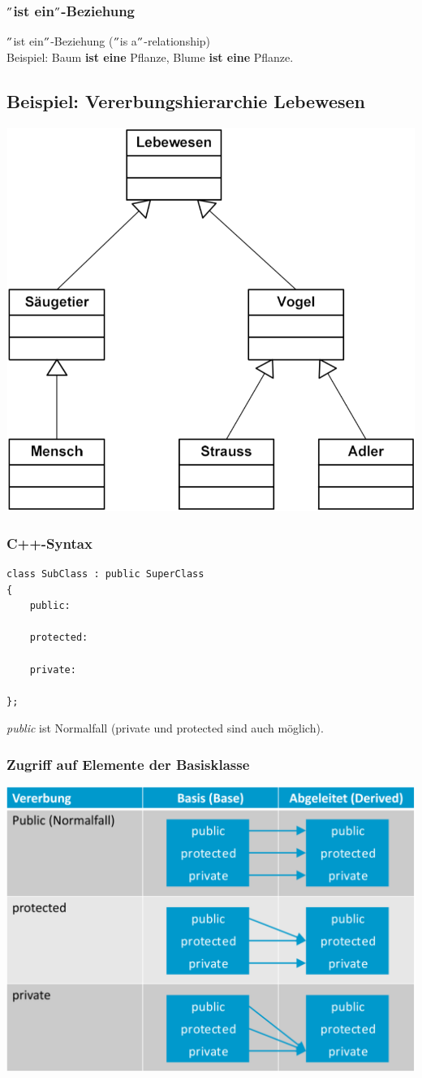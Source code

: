 \subsubsection{$"$ist ein$"$-Beziehung}
$"$ist ein$"$-Beziehung ($"$is a$"$-relationship)\\
Beispiel: Baum \textbf{ist eine} Pflanze, Blume \textbf{ist eine} Pflanze.

\subsection{Beispiel: Vererbungshierarchie Lebewesen}
\begin{multicols}{2}
\includegraphics[width=0.7\linewidth]{images/vererbung3.png}
\vfill\null
\columnbreak
\subsubsection{C++-Syntax}
\begin{minipage}{\linewidth}
\vspace{-\baselineskip}
\begin{lstlisting}
class SubClass : public SuperClass
{
	public:
	
	protected:
	
	private:
	
};
\end{lstlisting}
\end{minipage}
\emph{public} ist Normalfall (private und protected sind auch möglich).
\vfill\null
\end{multicols}

\subsubsection{Zugriff auf Elemente der Basisklasse}
\includegraphics[width=0.5\linewidth]{images/vererbung4.png}

